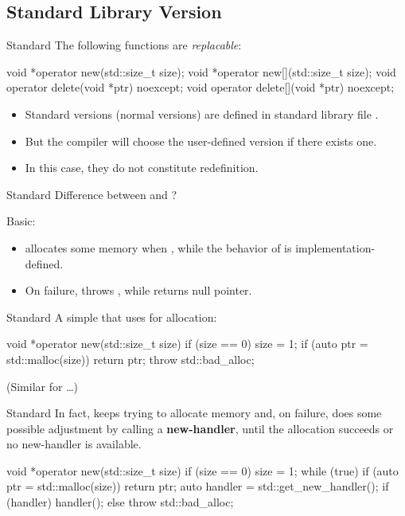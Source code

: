 \documentclass{beamer}
\begin{document}
\subsection{Standard Library Version}

\begin{frame}[fragile]{Standard }
  The following functions are \textit{replacable}:
  \begin{cpp}
void *operator new(std::size_t size);
void *operator new[](std::size_t size);
void operator delete(void *ptr) noexcept;
void operator delete[](void *ptr) noexcept;
  \end{cpp}
  \begin{itemize}
    \item Standard versions (normal versions) are defined in standard library file .
    \item But the compiler will choose the user-defined version if there exists one.
    \item In this case, they do not constitute redefinition.
  \end{itemize}
\end{frame}

\begin{frame}{Standard }
  Difference between  and ?
  \pause
  \par Basic:
  \begin{itemize}
    \item {} allocates some memory when , while the behavior of  is implementation-defined.
    \item On failure,  throws , while  returns null pointer.
  \end{itemize}
\end{frame}

\begin{frame}[fragile]{Standard }
  A simple  that uses  for allocation:
  \begin{cpp}
void *operator new(std::size_t size) {
  if (size == 0)
    size = 1;
  if (auto ptr = std::malloc(size))
    return ptr;
  throw std::bad_alloc{};
}
  \end{cpp}
  (Similar for \ttt{[]}\dots)
\end{frame}

\begin{frame}[fragile]{Standard }
  In fact,  keeps trying to allocate memory and, on failure, does some possible adjustment by calling a \textbf{new-handler}, until the allocation succeeds or no new-handler is available.
  \begin{cpp}[\scriptsize]
void *operator new(std::size_t size) {
  if (size == 0)
    size = 1;
  while (true) {
    if (auto ptr = std::malloc(size))
      return ptr;
    auto handler = std::get_new_handler();
    if (handler)
      handler();
    else
      throw std::bad_alloc{};
  }
}
  \end{cpp}
\end{frame}
\end{document}
